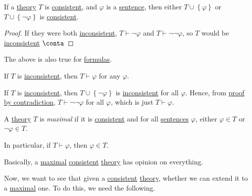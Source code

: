 \begin{proposition}\label{prop:either-consistent}
	If a \hyperref[def:theory]{theory} \(T\) is \hyperref[def:consistent]{consistent}, and \(\varphi \) is a \hyperref[def:sentence]{sentence}, then either \(T\cup \left\{ \varphi  \right\} \) or \(T\cup \left\{ \lnot \varphi \right\} \) is \hyperref[def:consistent]{consistent}.
\end{proposition}
\begin{proof}
	If they were both \hyperref[def:inconsistent]{inconsistent}, \(T\vdash \lnot \varphi \) and \(T\vdash \lnot \lnot \varphi \), so \(T\) would be \hyperref[def:inconsistent]{inconsistent} \(\conta\)
\end{proof}

\begin{note}
	The above is also true for \hyperref[def:formula]{formulas}.
\end{note}

\begin{remark}
	If \(T\) is \hyperref[def:inconsistent]{inconsistent}, then \(T \vdash \varphi \) for any \(\varphi \).
\end{remark}
\begin{explanation}
	If \(T\) is \hyperref[def:inconsistent]{inconsistent}, then \(T\cup \left\{ \lnot \varphi  \right\} \) is \hyperref[def:inconsistent]{inconsistent} for all \(\varphi \). Hence, from \hyperref[prop:proof-by-contradiction]{proof by contradiction}, \(T\vdash \lnot \lnot \varphi \) for all \(\varphi \), which is just \(T \vdash \varphi \).
\end{explanation}

\begin{definition}[Maximal]\label{def:maximal}
	A \hyperref[def:theory]{theory} \(T\) is \emph{maximal} if it is \hyperref[def:consistent]{consistent} and for all \hyperref[def:sentence]{sentences} \(\varphi \), either \(\varphi \in T\) or \(\lnot \varphi \in T\).
\end{definition}

In particular, if \(T\vdash \varphi \), then \(\varphi \in T\).

\begin{intuition}
	Basically, a \hyperref[def:maximal]{maximal} \hyperref[def:consistent]{consistent} \hyperref[def:theory]{theory} has opinion on everything.
\end{intuition}

Now, we want to see that given a \hyperref[def:consistent]{consistent} \hyperref[def:theory]{theory}, whether we can extend it to a \hyperref[def:maximal]{maximal} one. To do this, we need the following.

